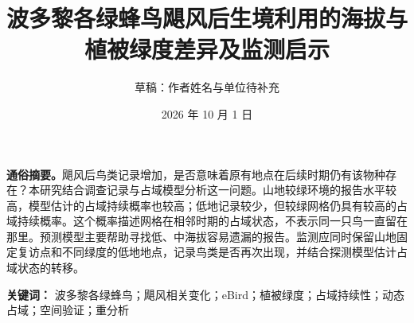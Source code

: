 \documentclass[11pt]{article}
\title{波多黎各绿蜂鸟飓风后生境利用的海拔与植被绿度差异及监测启示}
\author{草稿：作者姓名与单位待补充}
\date{2026 年 10 月 1 日}
\begin{document}
\maketitle
\noindent\textbf{通俗摘要。}飓风后鸟类记录增加，是否意味着原有地点在后续时期仍有该物种存在？本研究结合调查记录与占域模型分析这一问题。山地较绿环境的报告水平较高，模型估计的占域持续概率也较高；低地记录较少，但较绿网格仍具有较高的占域持续概率。这个概率描述网格在相邻时期的占域状态，不表示同一只鸟一直留在那里。预测模型主要帮助寻找低、中海拔容易遗漏的报告。监测应同时保留山地固定复访点和不同绿度的低地地点，记录鸟类是否再次出现，并结合探测模型估计占域状态的转移。\par\medskip
\begin{abstract}\end{abstract}
\noindent\textbf{关键词：} 波多黎各绿蜂鸟；飓风相关变化；eBird；植被绿度；占域持续性；动态占域；空间验证；重分析




\clearpage


\end{document}
